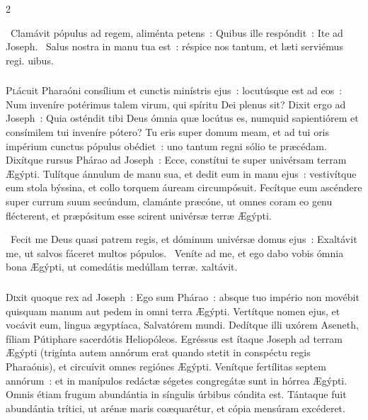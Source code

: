 \documentclass[9pt,twoside]{extarticle}
\begin{document}
\begin{multicols}{2}
{{{\begin{tightlist}{}
\item {}~Clamávit pópulus ad regem, aliménta petens~: \textred{*} Quibus ille respóndit~: Ite ad Joseph. ~Salus nostra in manu tua est~: réspice nos tantum, et læti serviémus regi. uibus.
\end{tightlist}

\subsubsection*{\center {}}
\lettrine{P}lácuit Pharaóni consílium et cunctis minístris ejus~:
locutúsque est ad eos~: Num inveníre potérimus talem virum, qui spíritu Dei plenus sit?
Dixit ergo ad Joseph~: Quia osténdit tibi Deus ómnia quæ locútus es, numquid sapientiórem et consímilem tui inveníre pótero?
Tu eris super domum meam, et ad tui oris impérium cunctus pópulus obédiet~: uno tantum regni sólio te præcédam.
Dixítque rursus Phárao ad Joseph~: Ecce, constítui te super univérsam terram Ægýpti.
Tulítque ánnulum de manu sua, et dedit eum in manu ejus~: vestivítque eum stola býssina, et collo torquem áuream circumpósuit.
Fecítque eum ascéndere super currum suum secúndum, clamánte præcóne, ut omnes coram eo genu flécterent, et præpósitum esse scirent univérsæ terræ Ægýpti.

\begin{tightlist}{}
\item {}~Fecit me Deus quasi patrem regis, et dóminum univérsæ domus ejus~: \textred{*} Exaltávit me, ut salvos fáceret multos pópulos. ~Veníte ad me, et ego dabo vobis ómnia bona Ægýpti, ut comedátis medúllam terræ. xaltávit.
\end{tightlist}

\subsubsection*{\center {}}
\lettrine{D}ixit quoque rex ad Joseph~: Ego sum Phárao~: absque tuo império non movébit quisquam manum aut pedem in omni terra Ægýpti.
Vertítque nomen ejus, et vocávit eum, lingua ægyptíaca, Salvatórem mundi. Dedítque illi uxórem Aseneth, fíliam Pútiphare sacerdótis Heliopóleos. Egréssus est ítaque Joseph ad terram Ægýpti
(trigínta autem annórum erat quando stetit in conspéctu regis Pharaónis), et circuívit omnes regiónes Ægýpti.
Venítque fertílitas septem annórum~: et in manípulos redáctæ ségetes congregátæ sunt in hórrea Ægýpti.
Omnis étiam frugum abundántia in síngulis úrbibus cóndita est.
Tántaque fuit abundántia trítici, ut arénæ maris coæquarétur, et cópia mensúram excéderet.

}}}
\end{multicols}
\end{document}
